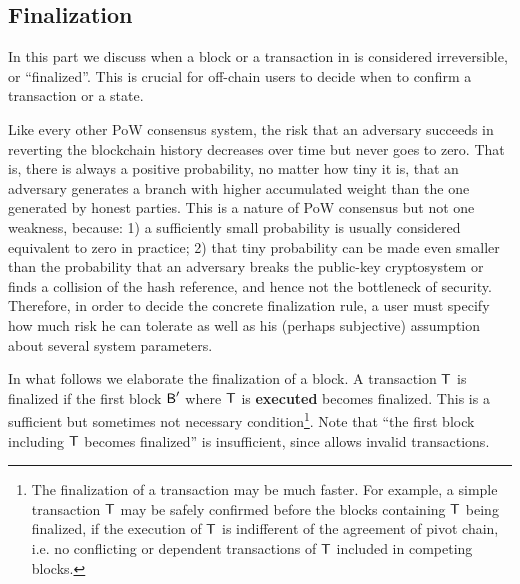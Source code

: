 \subsection{Finalization}

In this part we discuss when a block or a transaction in {\name} is considered irreversible, or ``finalized''.
This is crucial for off-chain users to decide when to confirm a transaction or a state.

Like every other PoW consensus system, the risk that an adversary succeeds in reverting the blockchain history decreases over time but never goes to zero.
That is, there is always a positive probability, no matter how tiny it is, that an adversary generates a branch with higher accumulated weight than the one generated by honest parties.
This is a nature of PoW consensus but not one weakness, because:
1) a sufficiently small probability is usually considered equivalent to zero in practice;
2) that tiny probability can be made even smaller than the probability that an adversary breaks the public-key cryptosystem or finds a collision of the hash reference, and hence not the bottleneck of security.
Therefore, in order to decide the concrete finalization rule, 
a user must specify how much risk he can tolerate as well as his (perhaps subjective) assumption about several system parameters.


In what follows we elaborate the finalization of a block.
A transaction $\textsf{T}$ is finalized if the first block $\textsf{B}'$ where $\textsf{T}$ is \textbf{executed} becomes finalized.
This is a sufficient but sometimes not necessary condition\footnote{The finalization of a transaction may be much faster. For example,  a simple transaction $\textsf{T}$ may be safely confirmed before the blocks containing $\textsf{T}$ being finalized, 
if the execution of $\textsf{T}$ is indifferent of the agreement of pivot chain, i.e. no conflicting or dependent transactions of $\textsf{T}$ included in competing blocks.}.
Note that ``the first block including $\textsf{T}$ becomes finalized'' is insufficient, since {\name} allows invalid transactions.

